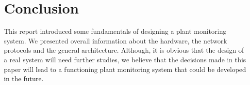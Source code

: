 \section{Conclusion}
This report introduced some fundamentals of designing a plant monitoring system. We presented overall information about the hardware, the network protocols and the general architecture. Although, it is obvious that the design of a real system will need further studies, we believe that the decisions made in this paper will lead to a functioning plant monitoring system that could be developed in the future.